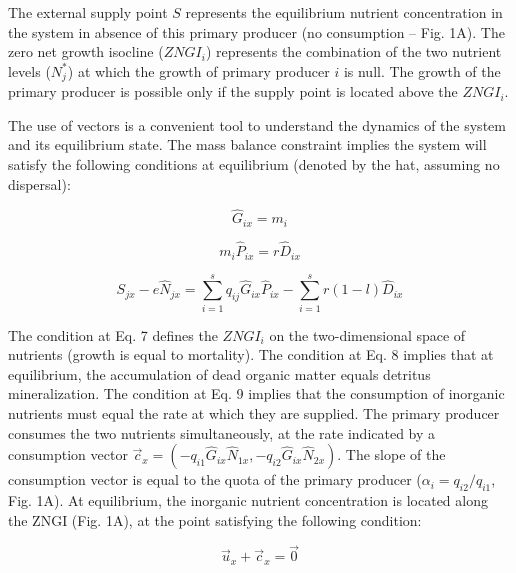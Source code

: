 \documentclass[letterpaper,twocolumn,showkeys]{revtex4-1}
\begin{document}
The external supply point $S$ represents the equilibrium nutrient concentration in the system in absence of this primary producer (no consumption – Fig. 1A). The zero net growth isocline ($ZNGI_i$) represents the combination of the two nutrient levels ($N_{j}^*$) at which the growth of primary producer $i$ is null. The growth of the primary producer is possible only if the supply point is located above the $ZNGI_i$. 

The use of vectors is a convenient tool to understand the dynamics of the system and its equilibrium state. The mass balance constraint implies the system will satisfy the following conditions at equilibrium (denoted by the hat, assuming no dispersal):

\begin{equation}
	\label{e:bnet}
	\widehat{G} _{ix}= m_{i} 
\end{equation}

\begin{equation}
	\label{e:bnet}
	m_{i}\widehat{P}_{ix}=r\widehat{D}_{ix} 
\end{equation}

\begin{equation}
	\label{e:bnet}
	S_{jx}-e\widehat{N}_{jx}=\sum_{i=1}^{s}q_{ij}\widehat{G}_{ix}\widehat{P}_{ix}-\sum_{i=1}^{s}r(1-l)\widehat{D}_{ix}
\end{equation}

The condition at Eq. 7 defines the $ZNGI_i$ on the two-dimensional space of nutrients (growth is equal to mortality). The condition at Eq. 8 implies that at equilibrium, the accumulation of dead organic matter equals detritus mineralization. The condition at Eq. 9 implies that the consumption of inorganic nutrients must equal the rate at which they are supplied. The primary producer consumes the two nutrients simultaneously, at the rate indicated by a consumption vector $\overrightarrow{c}_{x} = (-q_{i1}\widehat{G}_{ix}\widehat{N}_{1x},-q_{i2}\widehat{G}_{ix}\widehat{N}_{2x})$. The slope of the consumption vector is equal to the quota of the primary producer ($\alpha_{i}=q_{i2}/q_{i1}$, Fig. 1A). At equilibrium, the inorganic nutrient concentration is located along the ZNGI (Fig. 1A), at the point satisfying the following condition:

\begin{equation}
	\label{e:bnet}
	\overrightarrow{u}_{x}+\overrightarrow{c}_{x}=\overrightarrow{0}
\end{equation}		 	
\end{document}
